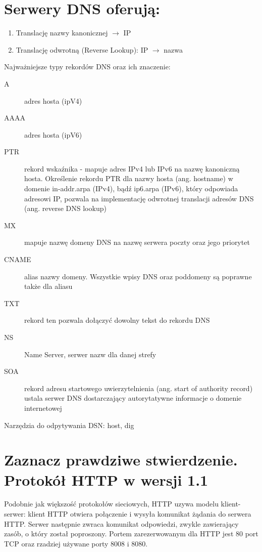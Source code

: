 \section{Serwery DNS oferują:}
\vspace{0.4cm}
\noindent
\begin{enumerate}
\item Translację nazwy kanonicznej $\rightarrow$ IP
\item Translację odwrotną (Reverse Lookup): IP $\rightarrow$ nazwa
\end{enumerate}
\vspace{0.4cm}
Najważniejsze typy rekordów DNS oraz ich znaczenie:
\begin{description}

\item[A] adres hosta (ipV4) 
\item[AAAA]  adres hosta (ipV6) 
\item[PTR]  	
	rekord wskaźnika - mapuje adres IPv4 lub IPv6 na nazwę kanoniczną hosta. 		Określenie rekordu PTR dla nazwy hosta (ang. hostname) w domenie in-addr.arpa 	(IPv4), bądź ip6.arpa (IPv6), który odpowiada adresowi IP, pozwala na 			implementację odwrotnej translacji adresów DNS (ang. reverse DNS lookup) 
\item[MX] mapuje nazwę domeny DNS na nazwę serwera poczty oraz jego priorytet 
\item[CNAME]	alias nazwy domeny. Wszystkie wpisy DNS oraz poddomeny są 	poprawne także dla aliasu 
\item[TXT]	rekord ten pozwala dołączyć dowolny tekst do rekordu DNS 
\item[NS] Name Server, serwer nazw dla danej strefy 
\item[SOA]    rekord adresu startowego uwierzytelnienia (ang. start of authority record) ustala serwer DNS dostarczający autorytatywne informacje o domenie internetowej 
\end{description}

Narzędzia do odpytywania DSN: host, dig

\section{Zaznacz prawdziwe stwierdzenie. Protokół HTTP w  wersji 1.1}

\vspace{0.4cm}
\noindent

Podobnie jak większość protokołów sieciowych, HTTP uzywa modelu klient-serwer: klient HTTP otwiera połączenie i wysyła komunikat żądania do serwera HTTP. Serwer następnie zwraca komunikat odpowiedzi, zwykle zawierający zasób, o który został poproszony.
Portem zarezerwowanym dla HTTP jest 80 port TCP oraz rzadziej używane porty 8008 i 8080.\\

